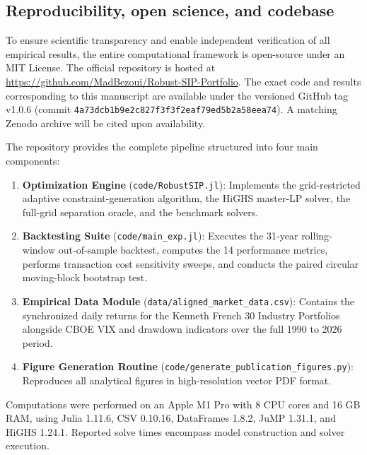 \documentclass[11pt, a4paper]{article}
\begin{document}
\subsection{Reproducibility, open science, and codebase}
To ensure scientific transparency and enable independent verification of all empirical results, the entire computational framework is open-source under an MIT License. The official repository is hosted at \url{https://github.com/MadBezoui/Robust-SIP-Portfolio}. The exact code and results corresponding to this manuscript are available under the versioned GitHub tag v1.0.6 (commit \texttt{4a73dcb1b9e2c827f3f3f2eaf79ed5b2a58eea74}). A matching Zenodo archive will be cited upon availability.

The repository provides the complete pipeline structured into four main components:
\begin{enumerate}
    \item \textbf{Optimization Engine} (\texttt{code/RobustSIP.jl}): Implements the grid-restricted adaptive constraint-generation algorithm, the HiGHS master-LP solver, the full-grid separation oracle, and the benchmark solvers.
    \item \textbf{Backtesting Suite} (\texttt{code/main\_exp.jl}): Executes the 31-year rolling-window out-of-sample backtest, computes the 14 performance metrics, performs transaction cost sensitivity sweeps, and conducts the paired circular moving-block bootstrap test.
    \item \textbf{Empirical Data Module} (\texttt{data/aligned\_market\_data.csv}): Contains the synchronized daily returns for the Kenneth French 30 Industry Portfolios alongside CBOE VIX and drawdown indicators over the full 1990 to 2026 period.
    \item \textbf{Figure Generation Routine} (\texttt{code/generate\_publication\_figures.py}): Reproduces all analytical figures in high-resolution vector PDF format.
\end{enumerate}

Computations were performed on an Apple M1 Pro with 8 CPU cores and 16 GB RAM, using Julia 1.11.6, CSV 0.10.16, DataFrames 1.8.2, JuMP 1.31.1, and HiGHS 1.24.1. Reported solve times encompass model construction and solver execution.
\end{document}
